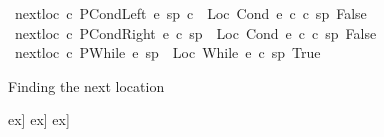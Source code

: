 \begin{isabellebody}
\begin{figure}[h!]
{\isacharbar}\ {\isachardoublequoteopen}next{\isacharunderscore}loc\ c\ {\isacharparenleft}PCondLeft\ e\ sp\ c\ {\isacharequal}\ {\isacharparenleft}Loc\ {\isacharparenleft}Cond\ e\ c\ c\ sp{\isacharcomma}\ False{\isacharparenright}{\isachardoublequoteclose}\isanewline
{\isacharbar}\ {\isachardoublequoteopen}next{\isacharunderscore}loc\ c\ {\isacharparenleft}PCondRight\ e\ c\ sp{\isacharparenright}\ {\isacharequal}\ {\isacharparenleft}Loc\ {\isacharparenleft}Cond\ e\ c\ c{\isacharparenright}\ sp{\isacharcomma}\ False{\isacharparenright}{\isachardoublequoteclose}\isanewline
{\isacharbar}\ {\isachardoublequoteopen}next{\isacharunderscore}loc\ c\ {\isacharparenleft}PWhile\ e\ sp{\isacharparenright}\ {\isacharequal}\ {\isacharparenleft}Loc\ {\isacharparenleft}While\ e\ c{\isacharparenright}\ sp{\isacharcomma}\ True{\isacharparenright}{\isachardoublequoteclose}\newline
\figline{}
\caption{Finding the next location}\label{fig:next_loc}
\end{figure}
\isadelimproof
\endisadelimproof
\isatagproof
\endisatagproof
{\isafoldproof}\isadelimproof
\endisadelimproof
\begin{figure}[h!]
\isastyleminor\isamarkuptrue
\figline{}
\begin{isamarkuptext}\begin{center}
\begin{small}
\2ex]
\2ex]
\2ex]

\end{small}
\end{center}
\end{isamarkuptext}
\end{figure}
\end{isabellebody}
